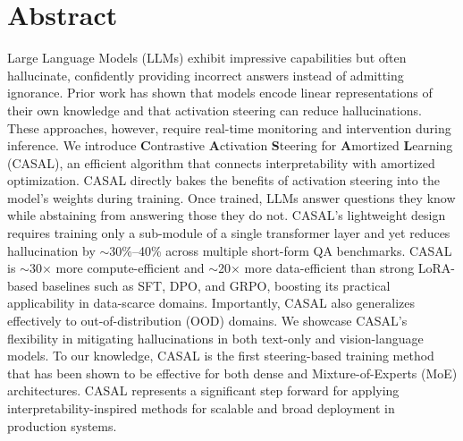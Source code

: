 
\newcommand{\known}[1]{\textcolor{CASALKnownGreen}{#1}}
\newcommand{\unknown}[1]{\textcolor{CASALUnknownRed}{#1}}


\section*{Abstract}

Large Language Models (LLMs) exhibit impressive capabilities but often hallucinate, confidently providing incorrect answers instead of admitting ignorance. Prior work has shown that models encode linear representations of their own knowledge and that activation steering can reduce hallucinations. These approaches, however, require real-time monitoring and intervention during inference. We introduce \textbf{C}ontrastive \textbf{A}ctivation \textbf{S}teering for \textbf{A}mortized \textbf{L}earning (CASAL), an efficient algorithm that connects interpretability with amortized optimization. CASAL directly bakes the benefits of activation steering into the model's weights during training. Once trained, LLMs answer questions they know while abstaining from answering those they do not. CASAL's lightweight design requires training only a sub-module of a single transformer layer and yet reduces hallucination by $\sim$30\%--40\% across multiple short-form QA benchmarks. CASAL is $\sim$30$\times$ more compute-efficient and $\sim$20$\times$ more data-efficient than strong LoRA-based baselines such as SFT, DPO, and GRPO, boosting its practical applicability in data-scarce domains. Importantly, CASAL also generalizes effectively to out-of-distribution (OOD) domains. We showcase CASAL's flexibility in mitigating hallucinations in both text-only and vision-language models. To our knowledge, CASAL is the first steering-based training method that has been shown to be effective for both dense and Mixture-of-Experts (MoE) architectures. CASAL represents a significant step forward for applying interpretability-inspired methods for scalable and broad deployment in production systems.

